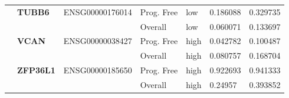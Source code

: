 \begin{spacing}{1}
{\begin{longtable}{|>{\bfseries}p{2cm}|>{\bfseries}p{1.9cm}|p{2.8cm}|p{2cm}|p{2cm}|p{1.5cm}|p{1.5cm}|}
            \hhline{~======}
             & TUBB6    & ENSG00000176014 & Prog. Free & low  & 0.186088 & 0.329735                \\
            \hhline{~~~----}
             &          &                 & Overall    & low  & 0.060071 & 0.133697                \\
            \hhline{~======}
             & VCAN     & ENSG00000038427 & Prog. Free & high & 0.042782 & 0.100487                \\
            \hhline{~~~----}
             &          &                 & Overall    & high & 0.080757 & 0.168704                \\
            \hhline{~======}
             & ZFP36L1  & ENSG00000185650 & Prog. Free & high & 0.922693 & 0.941333                \\
            \hhline{~~~----}
             &          &                 & Overall    & high & 0.24957  & 0.393852                \\
        \end{longtable}
    }
\end{spacing}

\newpage


